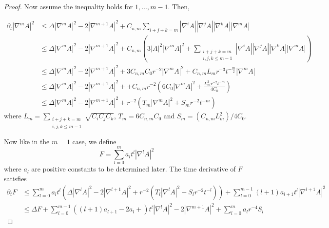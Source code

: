 \begin{proof}
    Now assume the inequality holds for $ 1, \dots,m-1 $. Then, 
  
      \begin{align*}
        \partial_{t}|\nabla^{m} A|^{2} &\le \Delta |\nabla^{m}A|^{2}- 2|\nabla^{m+1}A|^{2} + C_{n,m} \sum_{i+j+k= m}^{} |\nabla^{i}A||\nabla^{j}A||\nabla^{k}A||\nabla^{m}A|  \\
        & \le \Delta |\nabla^{m}A|^{2}- 2|\nabla^{m+1}A|^{2} + C_{n,m}\left( 3|A|^{2}|\nabla^{m}A|^{2} + \sum_{\substack{i+j+k=m\\i,j,k \le m-1}}^{}|\nabla^{i}A||\nabla^{j}A| |\nabla^{k}A||\nabla^{m} A|  \right) \\
        & \le \Delta|\nabla^{m}A|^{2}- 2|\nabla^{m+1}A|^{2}+ 3C_{n,m}C_{0}r^{-2}|\nabla^{m}A|^{2} + C_{n,m}L_{m}r^{-3}t^{-\frac{m}{2}}|\nabla^{m}A| \\
        & \le \Delta|\nabla^{m}A|^{2}- 2|\nabla^{m+1}A|^{2} + + C_{n,m}r^{-2}\left(6C_{0}|\nabla^{m}A|^{2} + \frac{L_{m}^{2}r^{-2}t^{-m}}{4C_{0}}  \right) \\
        & \le \Delta|\nabla^{m}A|^{2}- 2|\nabla^{m+1}A|^{2} + r^{-2}(T_{m}|\nabla^{m}A|^{2}+ S_{m}r^{-2}t^{-m})
    \end{align*}
    where $ L_{m} = \sum_{\substack{i+j+k=m\\i,j,k \le m-1}}\sqrt{C_{i}C_{j}C_{k}}  $, $ T_{m} = 6C_{n,m}C_{0} $ and $ S_{m} = (C_{n,m}L_{m}^{2}) / 4C_{0} $.

    Now like in the $ m=1 $ case, we define 
    \[ F = \sum_{l=0}^{m}a_{l}t^{l}|\nabla^{l} A|^{2} \]
    where $ a_{l} $ are positive constants to be determined later. The time derivative of $ F $ satisfies \begin{align*}
        \partial_{t}F & \le \sum_{l=0}^{m}a_{l}t^{l}\left(\Delta|\nabla^{l}A|^{2}- 2|\nabla^{l+1}A|^{2} + r^{-2}(T_{l}|\nabla^{l}A|^{2}+ S_{l}r^{-2}t^{-l}) \right) + \sum_{l=0}^{m-1}(l+1)a_{l+1}t^{l}|\nabla^{l+1}A|^{2} \\
        & \le \Delta F + \sum_{l=0}^{m-1}((l+1)a_{l+1}-2a_{l}+)t^{l}|\nabla^{l}A|^{2} -2|\nabla^{m+1}A|^{2} + \sum_{l=0}^{m}a_{l}r^{-4}S_{l} 
    \end{align*}
\begin{comment}
\begin{align*}
\partial_t Q_m \leq & \Delta Q_{m} -2 a_m t^m\left|\nabla^{m+1} \mathrm{A}\right|^2+c|A|^4 +\sum_{\ell=1}^m\left(\ell a_{\ell}-2 a_{\ell-1}\right) t^{\ell-1}\left|\nabla^{\ell} \mathrm{A}\right|^2 \\
& + c \sum_{l=1}^m t^{l} a_{\ell}\left(|\mathrm{A}|^2\left|\nabla^{\ell} \mathrm{II}\right|^2+2 A_{\ell}^{\frac{1}{2}} r^{-3} t^{-\frac{l}{2}}\left|\nabla^{l} \mathrm{A}\right|\right) \\
\leq & -2 a_m t^m\left|\nabla^{m+1} \mathrm{II}\right|^2+c r^{-4}\left(C_0^2+\sum_{\ell=1}^m A_{\ell}^{\frac{2}{3}} a_{\ell}\right) \\
& +\sum_{\ell=1}^m\left(\left(C_0+A_{\ell}^{\frac{1}{3}}\right) c a_{\ell} r^{-2} t+\ell a_{l}-2 a_{l-1}\right) t^{\ell-1}\left|\nabla^{l} A\right|^2
\end{align*}


\end{comment}
\end{proof}
